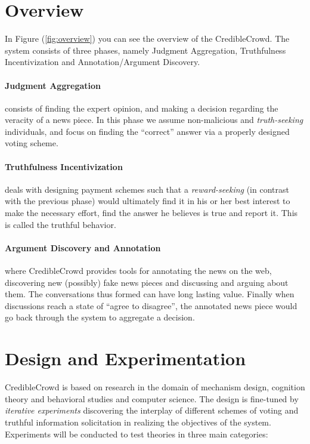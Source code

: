 \documentclass{report}
\theoremstyle{definition}
\begin{document}
\section{Overview}
In Figure (\ref{fig:overview}) you can see the overview of the CredibleCrowd. The system consists of three phases, namely Judgment Aggregation, Truthfulness Incentivization and Annotation/Argument Discovery.

\paragraph{Judgment Aggregation} consists of finding the expert opinion, and making a decision regarding the veracity of a news piece. In this phase we assume non-malicious and \emph{truth-seeking} individuals, and focus on finding the ``correct'' answer via a properly designed voting scheme.

\paragraph{Truthfulness Incentivization} deals with designing payment schemes such that a \emph{reward-seeking} (in contrast with the previous phase) would ultimately find it in his or her best interest to make the necessary effort, find the answer he believes is true and report it. This is called the truthful behavior.

\paragraph{Argument Discovery and Annotation} where CredibleCrowd provides tools for annotating the news on the web, discovering new (possibly) fake news pieces and discussing and arguing about them. The conversations thus formed can have long lasting value.  Finally when discussions reach a state of ``agree to disagree''\cite{shoam:mas}, the annotated news piece would go back through the system to aggregate a decision. 

\section{Design and Experimentation}
CredibleCrowd is based on research in the domain of mechanism design, cognition theory and behavioral studies and computer science. The design is fine-tuned by \emph{iterative experiments} discovering the interplay of different schemes of voting and truthful information solicitation in realizing the objectives of the system. Experiments will be conducted to test theories in three main categories:
\end{document}
